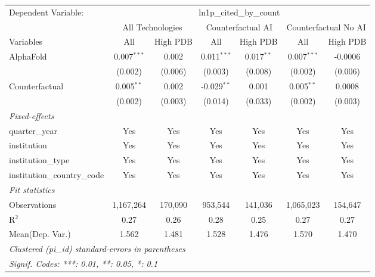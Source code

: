 \begingroup
\centering
\begin{tabular}{lcccccc}
   \tabularnewline \midrule \midrule
   Dependent Variable: & \multicolumn{6}{c}{ln1p\_cited\_by\_count}\\
 & \multicolumn{2}{c}{All Technologies} & \multicolumn{2}{c}{Counterfactual AI} & \multicolumn{2}{c}{Counterfactual No AI} \\
\cmidrule(lr){1-1}\cmidrule(lr){2-3} \cmidrule(lr){4-5} \cmidrule(lr){6-7}
Variables & \multicolumn{1}{c}{All} & \multicolumn{1}{c}{High PDB} & \multicolumn{1}{c}{All} & \multicolumn{1}{c}{High PDB} & \multicolumn{1}{c}{All} & \multicolumn{1}{c}{High PDB} \\
\cmidrule(lr){1-1}\cmidrule(lr){2-2} \cmidrule(lr){3-3} \cmidrule(lr){4-4} \cmidrule(lr){5-5} \cmidrule(lr){6-6} \cmidrule(lr){7-7}
   AlphaFold                    & 0.007$^{***}$ & 0.002   & 0.011$^{***}$ & 0.017$^{**}$ & 0.007$^{***}$ & -0.0006\\   
                                & (0.002)       & (0.006) & (0.003)       & (0.008)      & (0.002)       & (0.006)\\   
   Counterfactual               & 0.005$^{**}$  & 0.002   & -0.029$^{**}$ & 0.001        & 0.005$^{**}$  & 0.0008\\   
                                & (0.002)       & (0.003) & (0.014)       & (0.033)      & (0.002)       & (0.003)\\   
   \midrule
   \emph{Fixed-effects}\\
   quarter\_year                & Yes           & Yes     & Yes           & Yes          & Yes           & Yes\\  
   institution                  & Yes           & Yes     & Yes           & Yes          & Yes           & Yes\\  
   institution\_type            & Yes           & Yes     & Yes           & Yes          & Yes           & Yes\\  
   institution\_country\_code   & Yes           & Yes     & Yes           & Yes          & Yes           & Yes\\  
   \midrule
   \emph{Fit statistics}\\
   Observations                 & 1,167,264     & 170,090 & 953,544       & 141,036      & 1,065,023     & 154,647\\  
   R$^2$                        & 0.27          & 0.26    & 0.28          & 0.25         & 0.27          & 0.27\\  
Mean(Dep. Var.) & 1.562 & 1.481 & 1.528 & 1.476 & 1.570 & 1.470 \\
   \midrule \midrule
   \multicolumn{7}{l}{\emph{Clustered (pi\_id) standard-errors in parentheses}}\\
   \multicolumn{7}{l}{\emph{Signif. Codes: ***: 0.01, **: 0.05, *: 0.1}}\\
\end{tabular}
\par\endgroup
